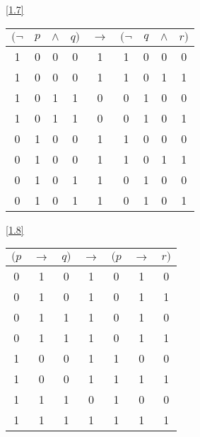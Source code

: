 \documentclass[boxes]{homework}
\begin{document}
\begin{solution}
    \ref{1.7}
    \begin{center}
        \begin{tabular}{cccc|c|cccc}
            $(\lnot$ & $p$ & $\land$ & $q)$ & $\to$ & $(\lnot$ & $q$ & $\land$ & $r)$ \\
            \hline
            1        & 0   & 0       & 0    & 1     & 1        & 0   & 0       & 0    \\
            1        & 0   & 0       & 0    & 1     & 1        & 0   & 1       & 1    \\
            1        & 0   & 1       & 1    & 0     & 0        & 1   & 0       & 0    \\
            1        & 0   & 1       & 1    & 0     & 0        & 1   & 0       & 1    \\
            0        & 1   & 0       & 0    & 1     & 1        & 0   & 0       & 0    \\
            0        & 1   & 0       & 0    & 1     & 1        & 0   & 1       & 1    \\
            0        & 1   & 0       & 1    & 1     & 0        & 1   & 0       & 0    \\
            0        & 1   & 0       & 1    & 1     & 0        & 1   & 0       & 1
        \end{tabular}
    \end{center}
    \ref{1.8}
    \begin{center}
        \begin{tabular}{ccc|c|ccc}
            $(p$ & $\to$ & $q)$ & $\to$ & $(p$ & $\to$ & $r)$ \\
            \hline
            0    & 1     & 0    & 1     & 0    & 1     & 0    \\
            0    & 1     & 0    & 1     & 0    & 1     & 1    \\
            0    & 1     & 1    & 1     & 0    & 1     & 0    \\
            0    & 1     & 1    & 1     & 0    & 1     & 1    \\
            1    & 0     & 0    & 1     & 1    & 0     & 0    \\
            1    & 0     & 0    & 1     & 1    & 1     & 1    \\
            1    & 1     & 1    & 0     & 1    & 0     & 0    \\
            1    & 1     & 1    & 1     & 1    & 1     & 1
        \end{tabular}
    \end{center}

\end{solution}
\end{document}
